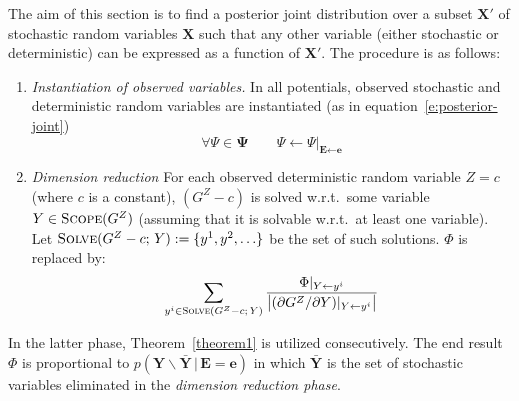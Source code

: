 \documentclass{article}
\newcommand{\bvec}[1]{\textbf{#1}}
\newcommand{\pr}{p}
\begin{document}
The aim of this section is to find a posterior joint distribution over a subset $\bvec{X}'$ of stochastic random variables $\bvec{X}$
such that any other variable (either stochastic or deterministic)
can be expressed as a function of $\bvec{X}'$.
The procedure
is as follows: 
\begin{enumerate}
\item \emph{Instantiation of observed variables.} 
In all potentials, observed stochastic and deterministic random variables are instantiated (as in equation~\ref{e:posterior-joint})
\begin{equation*}
\forall \Psi \in \boldsymbol{\Psi} \qquad \Psi \leftarrow \Psi|_{\bvec{E} \leftarrow \bvec{e}}
\end{equation*} 

%
%
%
\item \emph{Dimension reduction} %
For each observed deterministic random variable $Z = c$ (where $c$ is a constant),
$(G^Z - c)$ is solved w.r.t.\ some variable $Y \in \textsc{Scope}(G^Z)$ (assuming that it is solvable %
w.r.t.\ at least one variable).
Let $\textsc{Solve}(G^Z - c; \, Y) := \{y^{1}, y^{2}, \ldots\}$ be the set of such solutions.
$\Phi$ is replaced by:
\begin{equation}
\label{e:core}
\sum_{y^{i} \in \textsc{Solve}(G^Z - c;\, Y)}
\frac{\Phi|_{Y \leftarrow y^{i}}}{
\big|(\partial G^Z / \partial Y) |_{Y \leftarrow y^{i}}
\big|
}
\end{equation}
\end{enumerate}
In the latter phase, Theorem~\ref{theorem1} is utilized consecutively.  
The end result $\Phi$ is proportional to 
$\pr(\bvec{Y}\backslash \bar{\bvec{Y}} \,|\, \bvec{E} = \bvec{e})$ in which 
$\bar{\bvec{Y}}$ is the set of stochastic variables eliminated in the \emph{dimension reduction phase}. 
\end{document}

